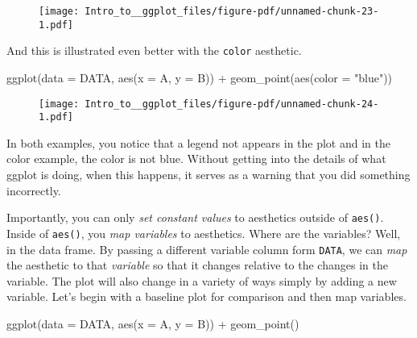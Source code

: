 \documentclass[
  letterpaper,
  DIV=11,
  numbers=noendperiod]{scrartcl}
\newenvironment{Shaded}{\begin{snugshade}}{\end{snugshade}}
\newcommand{\AttributeTok}[1]{\textcolor[rgb]{0.40,0.45,0.13}{#1}}
\newcommand{\FunctionTok}[1]{\textcolor[rgb]{0.28,0.35,0.67}{#1}}
\newcommand{\NormalTok}[1]{\textcolor[rgb]{0.00,0.23,0.31}{#1}}
\newcommand{\SpecialCharTok}[1]{\textcolor[rgb]{0.37,0.37,0.37}{#1}}
\newcommand{\StringTok}[1]{\textcolor[rgb]{0.13,0.47,0.30}{#1}}
\begin{document}
\begin{figure}[H]

{\centering \texttt{[image: Intro\_to\_\_ggplot\_files/figure-pdf/unnamed-chunk-23-1.pdf]}

}

\end{figure}

And this is illustrated even better with the \texttt{color} aesthetic.

\begin{Shaded}
\begin{Highlighting}[]
\FunctionTok{ggplot}\NormalTok{(}\AttributeTok{data =}\NormalTok{ DATA, }\FunctionTok{aes}\NormalTok{(}\AttributeTok{x =}\NormalTok{ A, }\AttributeTok{y =}\NormalTok{ B)) }\SpecialCharTok{+} 
  \FunctionTok{geom\_point}\NormalTok{(}\FunctionTok{aes}\NormalTok{(}\AttributeTok{color =} \StringTok{"blue"}\NormalTok{))}
\end{Highlighting}
\end{Shaded}

\begin{figure}[H]

{\centering \texttt{[image: Intro\_to\_\_ggplot\_files/figure-pdf/unnamed-chunk-24-1.pdf]}

}

\end{figure}

In both examples, you notice that a legend not appears in the plot and
in the color example, the color is not blue. Without getting into the
details of what ggplot is doing, when this happens, it serves as a
warning that you did something incorrectly.

Importantly, you can only \emph{set constant values} to aesthetics
outside of \texttt{aes()}. Inside of \texttt{aes()}, you \emph{map
variables} to aesthetics. Where are the variables? Well, in the data
frame. By passing a different variable column form \texttt{DATA}, we can
\emph{map} the aesthetic to that \emph{variable} so that it changes
relative to the changes in the variable. The plot will also change in a
variety of ways simply by adding a new variable. Let's begin with a
baseline plot for comparison and then map variables.

\begin{Shaded}
\begin{Highlighting}[]
\FunctionTok{ggplot}\NormalTok{(}\AttributeTok{data =}\NormalTok{ DATA, }\FunctionTok{aes}\NormalTok{(}\AttributeTok{x =}\NormalTok{ A, }\AttributeTok{y =}\NormalTok{ B)) }\SpecialCharTok{+} 
  \FunctionTok{geom\_point}\NormalTok{()}
\end{Highlighting}
\end{Shaded}
\end{document}
